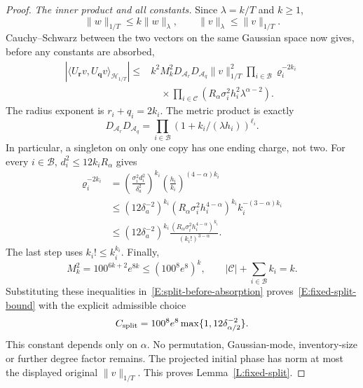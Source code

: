\documentclass[12pt]{article}
\numberwithin{equation}{section}
\theoremstyle{definition}
\begin{document}
\begin{proof}
  \emph{The inner product and all constants.}
  Since $\lambda=k/T$ and $k\ge1$,
  \[
    \|w\|_{1/T}\le k\|w\|_\lambda,\qquad
    \|v\|_\lambda\le\|v\|_{1/T}.
  \]
  Cauchy--Schwarz between the two vectors on the same Gaussian space
  now gives, before any constants are absorbed,
  \begin{equation}\label{E:split-before-absorption}
    \begin{split}
      |\langle U_{\boldsymbol r}v,U_{\boldsymbol q}v
      \rangle_{\mathcal H_{1/T}}|
      \le{}&k^2 M_k^2D_{\mathcal A_r}D_{\mathcal A_q}
      \|v\|_{1/T}^2
      \prod_{i\in\mathcal B}\varrho_i^{-2k_i}\\
      &\quad\times\prod_{i\in\mathcal C}
      (R_\alpha\sigma_i^2h_i^2\lambda^{\alpha-2}).
    \end{split}
  \end{equation}
  The radius exponent is $r_i+q_i=2k_i$. The metric product is exactly
  \[
    D_{\mathcal A_r}D_{\mathcal A_q}
    =\prod_{i\in\mathcal B}(1+k_i/(\lambda h_i))^{\ell_i}.
  \]
  In particular, a singleton on only one copy has one ending charge,
  not two. For every $i\in\mathcal B$, $d_i^2\le12k_iR_\alpha$ gives
  \begin{equation}\label{E:split-radius-factorial}
    \begin{split}
      \varrho_i^{-2k_i}
      &=\left(\frac{\sigma_i^2d_i^2}{\delta_a^2}\right)^{k_i}
      \left(\frac{h_i}{k_i}\right)^{(4-\alpha)k_i}\\
      &\le(12\delta_a^{-2})^{k_i}
      (R_\alpha\sigma_i^2h_i^{4-\alpha})^{k_i}
      k_i^{-(3-\alpha)k_i}\\
      &\le(12\delta_a^{-2})^{k_i}
      \frac{(R_\alpha\sigma_i^2h_i^{4-\alpha})^{k_i}}
      {(k_i!)^{3-\alpha}}.
    \end{split}
  \end{equation}
  The last step uses $k_i!\le k_i^{k_i}$.
  Finally,
  \[
    M_k^2=100^{6k+2}e^{8k}\le(100^8e^8)^k,
    \qquad |\mathcal C|+\sum_{i\in\mathcal B}k_i=k.
  \]
  Substituting these inequalities in~\eqref{E:split-before-absorption}
  proves~\eqref{E:fixed-split-bound} with the explicit admissible choice
  \begin{equation}\label{E:split-explicit-constant}
    C_{\rm split}=100^8e^8
    \max\{1,12\delta_{\alpha/2}^{-2}\}.
  \end{equation}
  This constant depends only on $\alpha$. No permutation, Gaussian-mode,
  inventory-size or further degree factor remains. The projected initial
  phase has norm at most the displayed original $\|v\|_{1/T}$.
  This proves Lemma~\ref{L:fixed-split}.
\end{proof}
\end{document}
